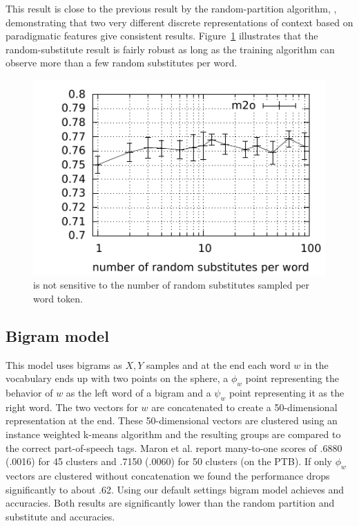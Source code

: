 This result is close to the previous result by the random-partition
algorithm, \rpmto, demonstrating that two very different discrete
representations of context based on paradigmatic features give
consistent results.  Figure~\ref{plot-s} illustrates that the
random-substitute result is fairly robust as long as the training
algorithm can observe more than a few random substitutes per word.

\begin{figure}[ht] \centering
\includegraphics[width=0.5\linewidth]{plot-s.pdf}
\caption{\mto is not sensitive to the number of random substitutes
  sampled per word token.}
\label{plot-s}
\end{figure}


\subsection{Bigram model}\label{sec:bigram}

This model uses bigrams as $X, Y$ samples and at the end each word $w$
in the vocabulary ends up with two points on the sphere, a $\phi_w$
point representing the behavior of $w$ as the left word of a bigram
and a $\psi_w$ point representing it as the right word.  The two
vectors for $w$ are concatenated to create a 50-dimensional
representation at the end.  These 50-dimensional vectors are clustered
using an instance weighted k-means algorithm and the resulting groups
are compared to the correct part-of-speech tags.  Maron et
al.  report many-to-one scores of .6880
(.0016) for 45 clusters and .7150 (.0060) for 50 clusters (on the
PTB).  If only $\phi_w$ vectors are clustered without concatenation we
found the performance drops significantly to about .62.  Using our
default settings bigram model achieves \bgmto \mto and \bgvm \vm
accuracies.  Both results are significantly lower than the random
partition and substitute \mto and \vm accuracies.
